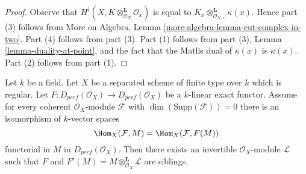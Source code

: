 \begin{proof}
Observe that $H^i(X, K \otimes_{\mathcal{O}_X}^\mathbf{L} \mathcal{O}_x)$
is equal to $K_x  \otimes_{\mathcal{O}_{X, x}}^\mathbf{L} \kappa(x)$.
Hence part (3) follows from More on Algebra, Lemma
\ref{more-algebra-lemma-cut-complex-in-two}.
Part (4) follows from part (3).
Part (1) follows from part (3), Lemma \ref{lemma-duality-at-point}, and the
fact that the Matlis dual of $\kappa(x)$ is $\kappa(x)$.
Part (2) follows from part (1).
\end{proof}

\begin{lemma}
\label{lemma-preserves-Coh}
Let $k$ be a field. Let $X$ be a separated scheme of finite type over $k$ which
is regular. Let $F : D_{perf}(\mathcal{O}_X) \to D_{perf}(\mathcal{O}_X)$
be a $k$-linear exact functor. Assume for every coherent
$\mathcal{O}_X$-module $\mathcal{F}$ with $\dim(\text{Supp}(\mathcal{F})) = 0$
there is an isomorphism of $k$-vector spaces
$$
\Hom_X(\mathcal{F}, M) = \Hom_X(\mathcal{F}, F(M))
$$
functorial in $M$ in $D_{perf}(\mathcal{O}_X)$.
Then there exists an invertible $\mathcal{O}_X$-module $\mathcal{L}$
such that $F$ and $F'(M) = M \otimes_{\mathcal{O}_X}^\mathbf{L} \mathcal{L}$
are siblings.
\end{lemma}

